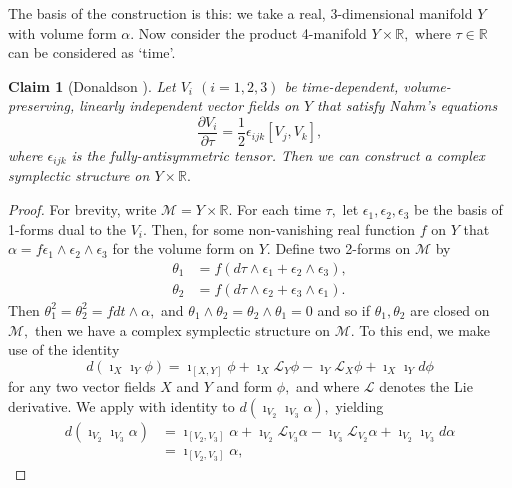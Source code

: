 \documentclass[a4paper,onecolumn,12pt]{article}
\newtheorem{claim}[thm]{Claim}
\theoremstyle{definition}
\theoremstyle{remark}
\newcommand{\al}{\alpha}
\newcommand{\e}{\epsilon}
\newcommand{\ddt}[1]{\frac{\partial #1}{\partial \tau}}
\newcommand{\R}{\mathbb{R}}
\begin{document}
The basis of the construction is this: we take a real, 3-dimensional manifold $Y$ with volume form $\al.$ Now consider the product 4-manifold $Y\times\R,$ where $\tau\in\R$ can be considered as `time'.\\

\begin{claim}[Donaldson \cite{donaldson}]
	Let $V_{i}$ $(i=1,2,3)$ be time-dependent, volume-preserving, linearly independent vector fields on $Y$ that satisfy Nahm's equations
	$$\ddt{V_{i}} = \frac{1}{2}\e_{ijk}[V_{j},V_{k}],
	$$
	where $\e_{ijk}$ is the fully-antisymmetric tensor. Then we can construct a complex symplectic structure on $Y\times\R.$
\end{claim}
\begin{proof}
	For brevity, write $\mathcal{M} = Y\times\R.$ For each time $\tau,$ let $\e_{1},\e_{2},\e_{3}$ be the basis of 1-forms dual to the $V_{i}.$ Then, for some non-vanishing real function $f$ on $Y$ that $\alpha=f\e_{1}\wedge\e_{2}\wedge\e_{3}$
	for the volume form on $Y.$ Define two 2-forms on $\mathcal{M}$ by
	\begin{subequations}
		\begin{align}
		\theta_{1} &= f(d\tau \wedge \e_{1} +  \e_{2}\wedge \e_{3}),\\
		\theta_{2} &= f(d\tau \wedge \e_{2} +  \e_{3}\wedge \e_{1}).
		\end{align}
	\end{subequations}
	Then $\theta^{2}_{1}=\theta^{2}_{2}=f dt\wedge\alpha,$ and $\theta_{1}\wedge\theta_{2}=\theta_{2}\wedge\theta_{1}=0$ and so if $\theta_{1}, \theta_{2}$ are closed on $\mathcal{M},$ then we have a complex symplectic structure on $\mathcal{M}.$ To this end, we make use of the identity
	\begin{equation}
	\label{cartan}
	d(\imath_{X}\imath_{Y}\phi) = \imath_{[X,Y]}\phi + \imath_{X}\mathcal{L}_{Y}\phi - \imath_{Y}\mathcal{L}_{X}\phi + \imath_{X}\imath_{Y}d\phi
	\end{equation}
	for any two vector fields $X$ and $Y$ and form $\phi,$ and where $\mathcal{L}$ denotes the Lie derivative. We apply with identity to $d(\imath_{V_{2}}\imath_{V_{3}}\alpha),$ yielding
	\begin{align*}
	d(\imath_{V_{2}}\imath_{V_{3}}\alpha) &= \imath_{[V_{2},V_{3}]}\alpha + \imath_{V_{2}}\mathcal{L}_{V_{3}}\alpha - \imath_{V_{3}}\mathcal{L}_{V_{2}}\alpha + \imath_{V_{2}}\imath_{V_{3}}d\alpha\\
	&= \imath_{[V_{2},V_{3}]}\alpha,
	\end{align*}

\end{proof}
\end{document}
